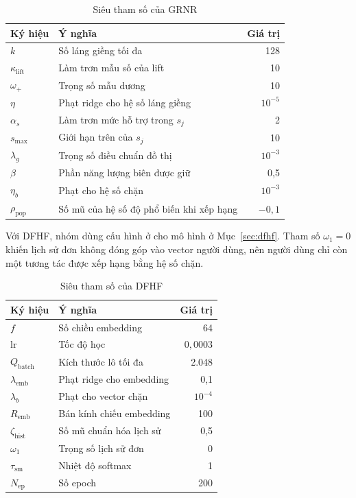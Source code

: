 \begingroup
\setlength{\intextsep}{1pt}
\begin{table}[H]
\centering
\captionsetup{skip=3pt}
{\fontsize{11.5}{13}\selectfont
\renewcommand{\arraystretch}{1}
\begin{tabular}{@{}llr@{}}
\toprule
Ký hiệu & Ý nghĩa & Giá trị \\
\midrule
$k$ & Số láng giềng tối đa & 128 \\
$\kappa_{\mathrm{lift}}$ & Làm trơn mẫu số của lift & 10 \\
$\omega_+$ & Trọng số mẫu dương & 10 \\
$\eta$ & Phạt ridge cho hệ số láng giềng & $10^{-5}$ \\
$\alpha_s$ & Làm trơn mức hỗ trợ trong $s_j$ & 2 \\
$s_{\max}$ & Giới hạn trên của $s_j$ & 10 \\
$\lambda_g$ & Trọng số điều chuẩn đồ thị & $10^{-3}$ \\
$\beta$ & Phần năng lượng biên được giữ & 0,5 \\
$\eta_b$ & Phạt cho hệ số chặn & $10^{-3}$ \\
$\rho_{\mathrm{pop}}$ & Số mũ của hệ số độ phổ biến khi xếp hạng & $-0{,}1$ \\
\bottomrule
\end{tabular}
}
\caption{Siêu tham số của GRNR}
\label{tab:grnr-hparams}
\end{table}
\endgroup

Với DFHF, nhóm dùng cấu hình ở  cho mô hình ở Mục~\ref{sec:dfhf}. Tham số $\omega_1=0$ khiến lịch sử đơn không đóng góp vào vector người dùng, nên người dùng chỉ còn một tương tác được xếp hạng bằng hệ số chặn.

\begingroup
\setlength{\intextsep}{1pt}
\begin{table}[H]
\centering
\captionsetup{skip=3pt}
{\fontsize{11.5}{13}\selectfont
\setlength{\tabcolsep}{9pt}
\begin{tabular}{@{}llr@{}}
\toprule
Ký hiệu & Ý nghĩa & Giá trị \\
\midrule
$f$ & Số chiều embedding & 64 \\
$\mathrm{lr}$ & Tốc độ học & $0{,}0003$ \\
$Q_{\mathrm{batch}}$ & Kích thước lô tối đa & 2.048 \\
$\lambda_{\mathrm{emb}}$ & Phạt ridge cho embedding & 0,1 \\
$\lambda_b$ & Phạt cho vector chặn & $10^{-4}$ \\
$R_{\mathrm{emb}}$ & Bán kính chiếu embedding & 100 \\
$\zeta_{\mathrm{hist}}$ & Số mũ chuẩn hóa lịch sử & 0,5 \\
$\omega_1$ & Trọng số lịch sử đơn & 0 \\
$\tau_{\mathrm{sm}}$ & Nhiệt độ softmax & 1 \\
$N_{\mathrm{ep}}$ & Số epoch & 200 \\
\bottomrule
\end{tabular}
}
\caption{Siêu tham số của DFHF}
\label{tab:dfhf-hparams}
\end{table}
\endgroup

